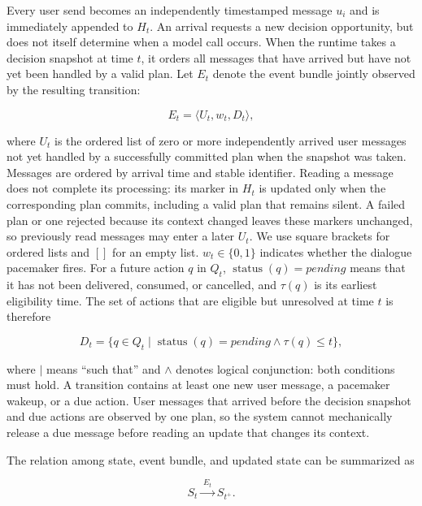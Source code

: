 \documentclass[manuscript,nonacm]{acmart}
\begin{document}
Every user send becomes an independently timestamped message $u_i$ and is
immediately appended to $H_t$. An arrival requests a new decision opportunity,
but does not itself determine when a model call occurs. When the runtime takes a
decision snapshot at time $t$, it orders all messages that have arrived but have
not yet been handled by a valid plan. Let $E_t$ denote the event bundle jointly
observed by the resulting transition:

\begin{equation}
E_t=\langle U_t,w_t,D_t\rangle,
\end{equation}

where $U_t$ is the ordered list of zero or more independently arrived user
messages not yet handled by a successfully committed plan when the snapshot was
taken. Messages are ordered by arrival time and stable identifier. Reading a
message does not complete its processing: its marker in $H_t$ is updated only
when the corresponding plan commits, including a valid plan that remains silent.
A failed plan or one rejected because its context changed leaves these markers
unchanged, so previously read messages may enter a later $U_t$. We use square brackets for
ordered lists and $[]$ for an empty list.
$w_t\in\{0,1\}$ indicates whether the dialogue pacemaker fires. For a future
action $q$ in $Q_t$, $\operatorname{status}(q)=\textit{pending}$ means that it
has not been delivered, consumed, or cancelled, and $\tau(q)$ is its earliest
eligibility time. The set of actions that are eligible but unresolved at time
$t$ is therefore

\begin{equation}
D_t=\{q\in Q_t\mid \operatorname{status}(q)=\textit{pending}
\land \tau(q)\leq t\},
\end{equation}

where $\mid$ means ``such that'' and $\land$ denotes logical conjunction: both
conditions must hold. A transition contains at least one new user message, a
pacemaker wakeup, or a due action. User messages that arrived before the decision
snapshot and due actions are observed by one plan, so the system cannot
mechanically release a due message before reading an update that changes its
context.

The relation among state, event bundle, and updated state can be summarized as

\begin{equation}
S_t \xrightarrow{\;E_t\;} S_{t^+}.
\end{equation}
\end{document}
